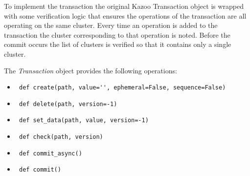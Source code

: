 To implement the transaction the original Kazoo Transaction object is wrapped with some verification logic that ensures the operations of the transaction are all operating on the same cluster. Every time an operation is added to the transaction the cluster corresponding to that operation is noted. Before the commit occurs the list of clusters is verified so that it contains only a single cluster.
    
The \textit{Transaction} object provides the following operations:
\begin{itemize}
	\item \lstinline | def create(path, value='', ephemeral=False, sequence=False) |
	\item \lstinline | def delete(path, version=-1) |
	\item \lstinline | def set_data(path, value, version=-1) |
	\item \lstinline | def check(path, version) |
	\item \lstinline | def commit_async() |
	\item \lstinline | def commit() |
\end{itemize}